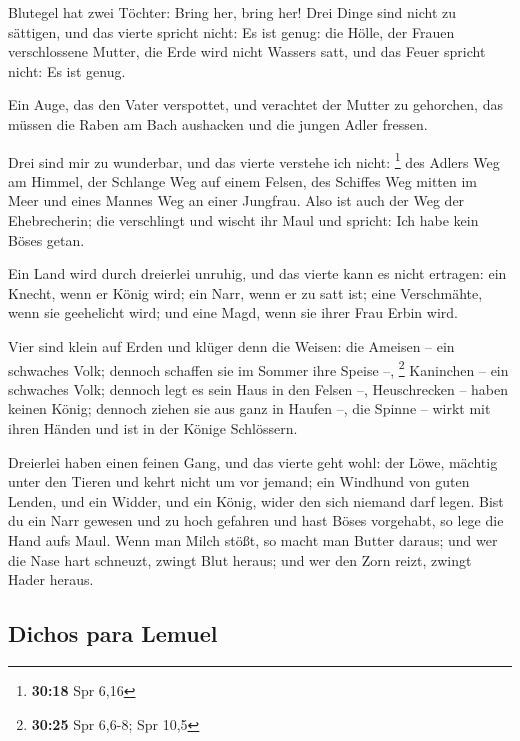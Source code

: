  Blutegel hat zwei Töchter: Bring her, bring her! Drei
Dinge sind nicht zu sättigen, und das vierte spricht nicht: Es ist
genug:  die Hölle, der Frauen verschlossene Mutter, die
Erde wird nicht Wassers satt, und das Feuer spricht nicht: Es ist genug.

 Ein Auge, das den Vater verspottet, und verachtet der
Mutter zu gehorchen, das müssen die Raben am Bach aushacken und die
jungen Adler fressen.

 Drei sind mir zu wunderbar, und das vierte verstehe ich
nicht: \footnote{\textbf{30:18} Spr 6,16}  des Adlers Weg
am Himmel, der Schlange Weg auf einem Felsen, des Schiffes Weg mitten im
Meer und eines Mannes Weg an einer Jungfrau.  Also ist
auch der Weg der Ehebrecherin; die verschlingt und wischt ihr Maul und
spricht: Ich habe kein Böses getan.

 Ein Land wird durch dreierlei unruhig, und das vierte
kann es nicht ertragen:  ein Knecht, wenn er König wird;
ein Narr, wenn er zu satt ist;  eine Verschmähte, wenn
sie geehelicht wird; und eine Magd, wenn sie ihrer Frau Erbin wird.

 Vier sind klein auf Erden und klüger denn die Weisen:
 die Ameisen -- ein schwaches Volk; dennoch schaffen sie
im Sommer ihre Speise --, \footnote{\textbf{30:25} Spr 6,6-8; Spr 10,5}
 Kaninchen -- ein schwaches Volk; dennoch legt es sein
Haus in den Felsen --,  Heuschrecken -- haben keinen
König; dennoch ziehen sie aus ganz in Haufen --,  die
Spinne -- wirkt mit ihren Händen und ist in der Könige Schlössern.

 Dreierlei haben einen feinen Gang, und das vierte geht
wohl:  der Löwe, mächtig unter den Tieren und kehrt nicht
um vor jemand;  ein Windhund von guten Lenden, und ein
Widder, und ein König, wider den sich niemand darf legen.
 Bist du ein Narr gewesen und zu hoch gefahren und hast
Böses vorgehabt, so lege die Hand aufs Maul.  Wenn man
Milch stößt, so macht man Butter daraus; und wer die Nase hart schneuzt,
zwingt Blut heraus; und wer den Zorn reizt, zwingt Hader heraus.

\hypertarget{dichos-para-lemuel}{%
\subsection{Dichos para Lemuel}\label{dichos-para-lemuel}}

